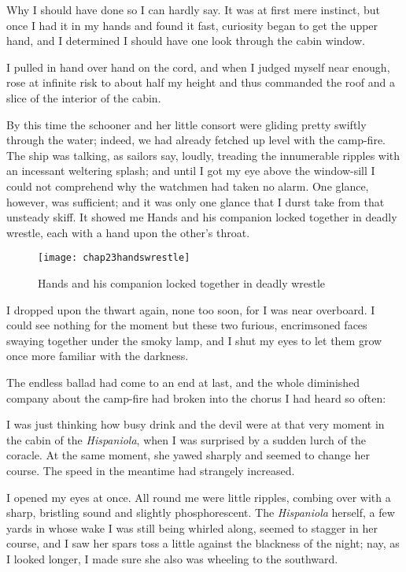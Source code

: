 Why I should have done so I can hardly say. It was at first mere instinct, but once I had it in my hands and found it fast, curiosity began to get the upper hand, and I determined I should have one look through the cabin window.

I pulled in hand over hand on the cord, and when I judged myself near enough, rose at infinite risk to about half my height and thus commanded the roof and a slice of the interior of the cabin.

By this time the schooner and her little consort were gliding pretty swiftly through the water; indeed, we had already fetched up level with the camp-fire. The ship was talking, as sailors say, loudly, treading the innumerable ripples with an incessant weltering splash; and until I got my eye above the window-sill I could not comprehend why the watchmen had taken no alarm. One glance, however, was sufficient; and it was only one glance that I durst take from that unsteady skiff. It showed me Hands and his companion locked together in deadly wrestle, each with a hand upon the other’s throat.

   \begin{figure}[p]
\centering
\texttt{[image: chap23handswrestle]}
\caption[Locked together in deadly wrestle]{Hands and his companion locked together in deadly wrestle}
\end{figure}  

I dropped upon the thwart again, none too soon, for I was near overboard. I could see nothing for the moment but these two furious, encrimsoned faces swaying together under the smoky lamp, and I shut my eyes to let them grow once more familiar with the darkness.

The endless ballad had come to an end at last, and the whole diminished company about the camp-fire had broken into the chorus I had heard so often:

\longyoho

I was just thinking how busy drink and the devil were at that very moment in the cabin of the \textit{Hispaniola}, when I was surprised by a sudden lurch of the coracle. At the same moment, she yawed sharply and seemed to change her course. The speed in the meantime had strangely increased.

I opened my eyes at once. All round me were little ripples, combing over with a sharp, bristling sound and slightly phosphorescent. The \textit{Hispaniola} herself, a few yards in whose wake I was still being whirled along, seemed to stagger in her course, and I saw her spars toss a little against the blackness of the night; nay, as I looked longer, I made sure she also was wheeling to the southward.

